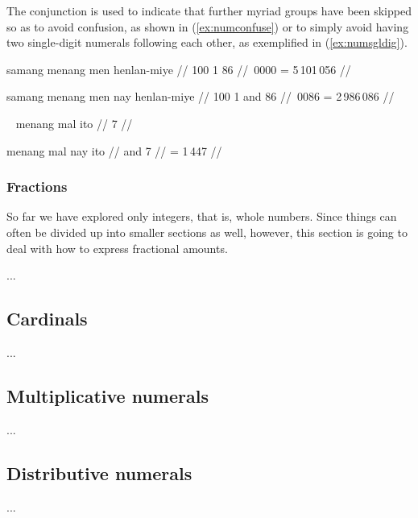 \xe

The conjunction  is used to indicate that further myriad 
groups have been skipped so as to avoid confusion, as shown in 
(\ref{ex:numconfuse}) or to simply avoid having two single-digit numerals 
following each other, as exemplified in (\ref{ex:numsgldig}).

\pex\label{ex:numconfuse}
\a\begingl
	\gla samang menang men henlan-miye //
	 {100} {1} {86} //
	\,0000 = 5\,101\,056 //
\endgl

\a\begingl
	\gla samang menang men nay henlan-miye //
	 {100} {1} and {86} //
	\,0086 = 2\,986\,086 //
\endgl

\xe

\pex~\label{ex:numsgldig}
\a\ljudge\ques\begingl
	\gla menang mal ito //
	 {\ten} {7} //
\endgl

\a\begingl
	\gla menang mal nay ito //
	 {\ten} and {7} //
	\glft {} = 1\,447 //
\endgl

\xe


\subsubsection{Fractions}

So far we have explored only integers, that is, whole numbers. Since things can 
often be divided up into smaller sections as well, however, this section is 
going to deal with how to express fractional amounts.

...



\subsection{Cardinals}

...


\subsection{Multiplicative numerals}

...


\subsection{Distributive numerals}

...


% 
% 
% 
